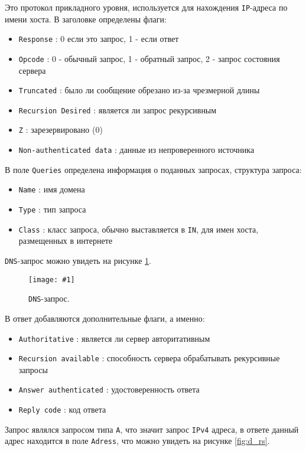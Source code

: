 \documentclass[12pt, a4paper]{article}
\newcommand{\figc}[4]{
  \begin{figure}[H]
  \begin{center}
    \texttt{[image: \#1]}
    \caption{#2}
    \label{fig:#3}
  \end{center}
  \end{figure}
}
\begin{document}
Это протокол прикладного уровня, используется для нахождения \texttt{IP}-адреса
по имени хоста. В заголовке определены флаги:

\begin{itemize}
  \item \texttt{Response} : 0 если это запрос, 1 - если ответ
  \item \texttt{Opcode} : 0 - обычный запрос, 1 - обратный запрос, 2 - запрос
    состояния сервера
  \item \texttt{Truncated} : было ли сообщение обрезано из-за чрезмерной длины
  \item \texttt{Recursion Desired} : является ли запрос рекурсивным
  \item \texttt{Z} : зарезервировано (0)
  \item \texttt{Non-authenticated data} : данные из непроверенного источника
\end{itemize}

В поле \texttt{Queries} определена информация о поданных запросах, структура
запроса:

\begin{itemize}
  \item \texttt{Name} : имя домена
  \item \texttt{Type} : тип запроса
  \item \texttt{Class} : класс запроса, обычно выставляется в \texttt{IN},
    для имен хоста, размещенных в интернете
\end{itemize}

\texttt{DNS}-запрос можно увидеть на рисунке \ref{fig:d_rq}.

\figc{dns_req}{\texttt{DNS}-запрос.}{d_rq}{2.5}

В ответ добавляются дополнительные флаги, а именно:

\begin{itemize}
  \item \texttt{Authoritative} : является ли сервер авторитативным
  \item \texttt{Recursion available} : способность сервера обрабатывать
    рекурсивные запросы
  \item \texttt{Answer authenticated} : удостоверенность ответа
  \item \texttt{Reply code} : код ответа
\end{itemize}

Запрос являлся запросом типа \texttt{A}, что значит запрос \texttt{IPv4} адреса,
в ответе данный адрес находится в поле \texttt{Adress}, что можно увидеть на
рисунке \ref{fig:d_rs}.
\end{document}
